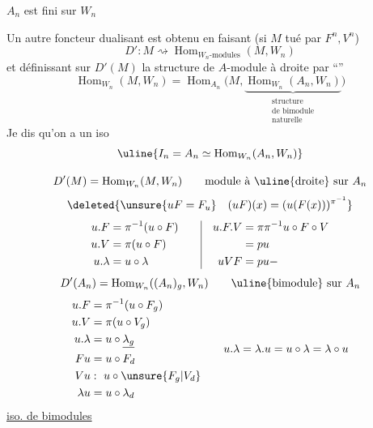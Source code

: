  $A_n$ est fini sur $W_n$

Un autre foncteur dualisant est obtenu en faisant (si $M$ tué par $F^n,V^n$)
\[
D':M\rightsquigarrow\operatorname{Hom}_{W_n\text{-modules}}(M,W_n)
\]
et définissant sur $D'(M)$ la structure de $A$-module à droite par ``''
\[
\operatorname{Hom}_{W_n}(M,W_n)=\operatorname{Hom}_{A_n}\bigl(M,\underbrace{\operatorname{Hom}_{W_n}(A_n,W_n)}_{\substack{\text{structure}\\\text{de bimodule}\\\text{naturelle}}}\bigr)
\]
Je dis qu'on a un iso
\[
\uline{I_n=A_n\simeq\operatorname{Hom}_{W_n}(A_n,W_n)}
\]

\[
D'(M)=\operatorname{Hom}_{W_n}(M,W_n)\qquad\text{module à \uline{droite} sur }A_n
\]
\[
\deleted{\unsure{uF=F_u}\quad(uF)(x)=(u(F(x)))^{\pi^{-1}}}
\]
\[
\begin{aligned}u.F&=\pi^{-1}(u\circ F)\\u.V&=\pi(u\circ F)\\u.\lambda&=u\circ\lambda\end{aligned}
\qquad\vrule\quad\begin{aligned}u.F.V&=\pi\pi^{-1}u\circ F\circ V\\&=pu\\uVF&=pu\mathbin{-}\end{aligned}
\]
\[
D'(A_n)=\operatorname{Hom}_{W_n}((A_n)_g,W_n)\qquad\text{\uline{bimodule} sur }A_n
\]
\[
\begin{aligned}
u.F&=\pi^{-1}(u\circ F_g)\\u.V&=\pi(u\circ V_g)\\u.\lambda&=u\circ\underline{\lambda_g}\\Fu&=u\circ F_d\\Vu&:\ u\circ\unsure{F_g|V_d}\\\lambda u&=u\circ\lambda_d
\end{aligned}
\qquad u.\lambda=\lambda.u=u\circ\lambda=\lambda\circ u
\]
\uline{iso. de bimodules}
